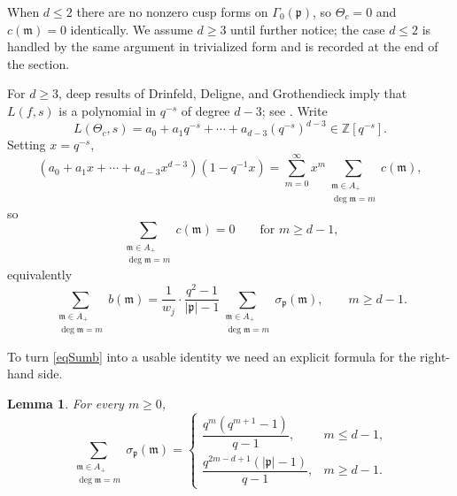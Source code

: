 \documentclass[12pt]{amsart}
\newtheorem{lem}[thm]{Lemma}
\theoremstyle{definition}
\theoremstyle{remark}
\numberwithin{equation}{section}
\numberwithin{thm}{section}
\newcommand{\fm}{\mathfrak{m}}
\newcommand{\fp}{\mathfrak{p}}
\newcommand{\Z}{\mathbb{Z}}
\newcommand{\G}{\Gamma}
\newcommand{\abs}[1]{\left|#1\right|}
\begin{document}
	When $d\leq 2$ there are no nonzero cusp forms on $\G_0(\fp)$, so $\Theta_c = 0$ and $c(\fm) = 0$ identically. We assume $d\geq 3$ until further notice; the case $d\leq 2$ is handled by the same argument in trivialized form and is recorded at the end of the section.
	
	For $d\geq 3$, deep results of Drinfeld, Deligne, and Grothendieck imply that $L(f,s)$ is a polynomial in $q^{-s}$ of degree $d-3$; see \cite[Ch. 2]{Pap03}. Write
	\[
	L(\Theta_c, s) = a_0 + a_1 q^{-s} + \cdots + a_{d-3} (q^{-s})^{d-3} \in \Z[q^{-s}].
	\]
	Setting $x = q^{-s}$,
	\[
	(a_0 + a_1 x + \cdots + a_{d-3} x^{d-3})(1-q^{-1}x) = \sum_{m=0}^\infty x^m \sum_{\substack{\fm\in A_+\\ \deg\fm = m}} c(\fm),
	\]
	so
	\[
	\sum_{\substack{\fm\in A_+\\ \deg\fm = m}} c(\fm) = 0 \qquad \text{for } m\geq d-1,
	\]
	equivalently
	\begin{equation}\label{eqSumb}
		\sum_{\substack{\fm\in A_+\\ \deg\fm = m}} b(\fm) = \frac{1}{w_j}\cdot \frac{q^2-1}{\abs{\fp}-1} \sum_{\substack{\fm\in A_+\\ \deg\fm = m}}\sigma_\fp(\fm), \qquad m\geq d-1.
	\end{equation}
	
	To turn \eqref{eqSumb} into a usable identity we need an explicit formula for the right-hand side.
	
	\begin{lem}\label{lem_sigmap}
		For every $m\geq 0$,
		\[
		\sum_{\substack{\fm\in A_+\\ \deg\fm = m}}\sigma_\fp(\fm) = \begin{cases}
			\dfrac{q^m(q^{m+1}-1)}{q-1}, & m\leq d-1, \\[1ex]
			\dfrac{q^{2m-d+1}(\abs{\fp}-1)}{q-1}, & m\geq d-1.
		\end{cases}
		\]
	\end{lem}
	
\end{document}
